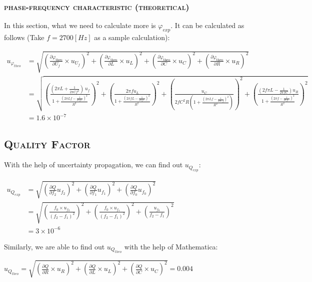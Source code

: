 \documentclass[a4paper,12pt]{article}
\begin{document}
\begin{appendices}
\subsubsection{\textsc{phase-frequency characteristic (theoretical)}}
In this section, what we need to calculate more is $\varphi_{exp}$. It can be calculated as follows (Take $f = 2700[Hz]$ as a sample calculation):
\begin{center}
\begin{scriptsize}
$\begin{aligned}
u_{\varphi_{theo }} &=\sqrt{\left(\frac{\partial \varphi_{\text {theo}}}{\partial U_{f}} \times u_{U_{f}}\right)^{2}+\left(\frac{\partial \varphi_{\text {theo}}}{\partial L} \times u_{L}\right)^{2}+\left(\frac{\partial \varphi_{\text {theo}}}{\partial C} \times u_{C}\right)^{2}+\left(\frac{\partial \varphi_{\text {theo}}}{\partial R} \times u_{R}\right)^{2}} \\ 
	&=\sqrt{ \left(\frac{(2\pi L + \frac{1}{2\pi Cf^2})~u_f}{1 + \frac{(2\pi Lf-\frac{1}{2\pi fC})^2}{R^2}}\right)^2 + \left(  \frac{2\pi f u_L}{1+\frac{\left(  2\pi f L - \frac{1}{2\pi fC}  \right)^2}{R^2}}  \right)^2 + \left(  \frac{u_C}{2fC^2R \left(  1 + \frac{(2\pi Lf -\frac{1}{2\pi Cf})^2}{R^2}  \right)}  \right)^2  + \left(\frac{(2f\pi L - \frac{1}{2\pi fC})u_R}{1+\frac{\left(  2\pi f -\frac{1}{2\pi fC}  \right)^2}{R^2}}   \right)^2} \\ 
	&=1.6 \times 10^{-7} 
\end{aligned}$
\end{scriptsize}
\end{center}

\subsection{\textsc{Quality Factor}}
With the help of uncertainty propagation, we can find out $u_{Q_{e x p}} $:
\begin{center}
$\begin{aligned} u_{Q_{e x p}} 
	&=\sqrt{\left(\frac{\partial Q}{\partial f_{2}}  u_{f_{2}}\right)^{2}+\left(\frac{\partial Q}{\partial f_{1}}  u_{f_{1}}\right)^{2} + \left(\frac{\partial Q}{\partial f_{0}}  u_{f_{0}}\right)^{2}} \\ 
	&=\sqrt{\left(\frac{f_{0} \times u_{f_{2}}}{\left(f_{2}-f_{1}\right)^{2}}\right)^{2}+\left(\frac{f_{0} \times u_{f_{1}}}{\left(f_{2}-f_{1}\right)^{2}}\right)^{2} + \left(\frac{u_{f_{0}}}{f_{2}-f_{1}}\right)^{2}} \\ 
	&=3 \times 10^{-6} \end{aligned}$
\end{center}
\par Similarly, we are able to find out $u_{Q_{theo}}$ with the help of Mathematica:
\begin{center}
$u_{Q_{t h e o}}=\sqrt{\left(\frac{\partial Q}{\partial R} \times u_{R}\right)^{2}+\left(\frac{\partial Q}{\partial L} \times u_{L}\right)^{2}+\left(\frac{\partial Q}{\partial C} \times u_{C}\right)^{2}}=0.004$
\end{center}


\end{appendices}
\end{document}
